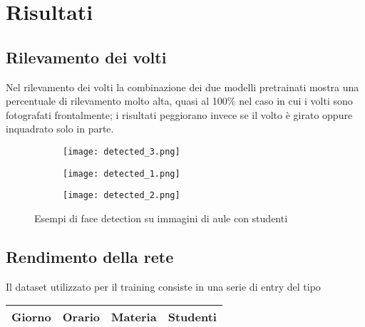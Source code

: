 \chapter{Risultati}
\label{section:results}

\section{Rilevamento dei volti}
\label{section:results_fd}

Nel rilevamento dei volti la combinazione dei due modelli pretrainati mostra
una percentuale di rilevamento molto alta, quasi al 100\% nel caso in cui i volti sono 
fotografati frontalmente; i risultati peggiorano invece se il volto è girato oppure 
inquadrato solo in parte. 

\smallskip

\begin{figure}[h]
    \centering
    \begin{subfigure}[b]{0.7\linewidth}
      \texttt{[image: detected\_3.png]}
    \end{subfigure}

    \smallskip
    
    \begin{subfigure}[b]{0.7\linewidth}
        \texttt{[image: detected\_1.png]}
    \end{subfigure}

    \smallskip
    
    \begin{subfigure}[b]{0.7\linewidth}
        \texttt{[image: detected\_2.png]}
    \end{subfigure}
    \caption{Esempi di face detection su immagini di aule con studenti}
    \label{fig:example_opencv}
\end{figure}

\section{Rendimento della rete}
\label{section:results_ml}

Il dataset utilizzato per il training consiste in una serie di entry del 
tipo

\begin{table}[h]
    \begin{small}
        \label{tab:dataset_entry}
        \begin{center}
            \begin{tabular}[c]{c|c|c|c}
                \hline
                \textbf{Giorno} & \textbf{Orario} & \textbf{Materia} & \textbf{Studenti} \\
                \hline
            \end{tabular}
        \end{center}
    \end{small}
\end{table}

